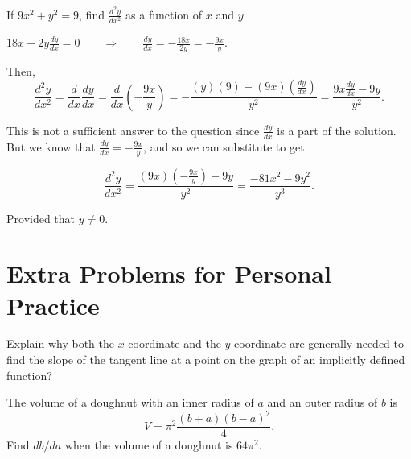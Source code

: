 \documentclass[handout,nooutcomes]{ximera}
\renewenvironment{freeResponse}{
\ifhandout\setbox0\vbox\bgroup\else
\begin{trivlist}\item[\hskip \labelsep\bfseries Solution:\hspace{2ex}]
\fi}
{\ifhandout\egroup\else
\end{trivlist}
\fi}
\newcommand{\dd}[2][]{\frac{d #1}{d #2}}
\newcommand{\ddx}{\frac{d}{dx}}
\begin{document}
\begin{problem}
  If $9x^2 + y^2 = 9$, find $\dd[^2 y]{x^2}$ as a function of $x$ and $y$.
  		\begin{freeResponse}
		$18x + 2y \dd[y]{x} = 0 \qquad \Longrightarrow \qquad \dd[y]{x} = - \frac{18x}{2y} = - \frac{9x}{y}$.
		
		Then,
		$$ \dd[^2y]{x^2} = \ddx \dd[y]{x} = \ddx \left( - \frac{9x}{y} \right) = - \frac{(y)(9) - (9x)(\dd[y]{x} )}{y^2} = \frac{9x\dd[y]{x} - 9y}{y^2}. $$
		
		This is not a sufficient answer to the question since $\dd[y]{x}$ is a part of the solution.  But we know that $\dd[y]{x} = -\frac{9x}{y}$, and so we can substitute to get
		
		$$ \dd[^2y]{x^2} = \frac{(9x) \left(- \frac{9x}{y} \right) - 9y}{y^2} = \frac{-81x^2 - 9y^2}{y^3}. $$
		
		Provided that $y \neq 0$.  
		\end{freeResponse}
\end{problem}

\section{Extra Problems for Personal Practice}
\begin{problem}
  Explain why both the $x$-coordinate and the $y$-coordinate are generally needed to find the slope of the tangent line at a point on the graph of an implicitly defined function?
\end{problem}

\begin{problem}
  The volume of a doughnut with an inner radius of $a$ and an outer radius of $b$ is 
  \[
    V = \pi^2 \frac{(b+a)(b-a)^2}{4}.
  \]
  Find $db/da$ when the volume of a doughnut is $64\pi^2$.
\end{problem}
\end{document}

